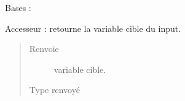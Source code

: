\documentclass[letterpaper,10pt,french]{sphinxmanual}
\begin{document}
\begin{fulllineitems}
\label{\detokenize{structuresnodes:structuresnodes.InputNode}}
Bases : {\hyperref[\detokenize{structuresnodes:structuresnodes.StructureNode}]{}}

\begin{fulllineitems}
\label{\detokenize{structuresnodes:structuresnodes.InputNode.cible}}
Accesseur : retourne la variable cible du input.
\begin{quote}\begin{description}
\item[{Renvoie}] \leavevmode
variable cible.

\item[{Type renvoyé}] \leavevmode
{\hyperref[\detokenize{variable:variable.Variable}]{}}

\end{description}\end{quote}

\end{fulllineitems}


\end{fulllineitems}

\end{document}
